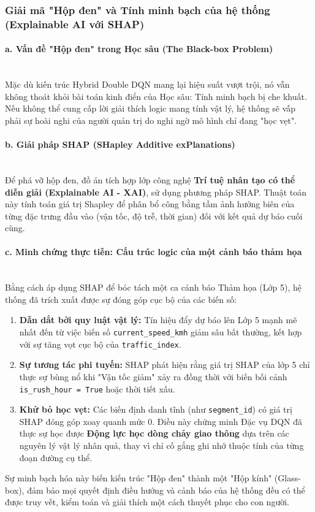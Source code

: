 \subsubsection{Giải mã "Hộp đen" và Tính minh bạch của hệ thống (Explainable AI với SHAP)}

\paragraph{a. Vấn đề "Hộp đen" trong Học sâu (The Black-box Problem)} \mbox{} \\
Mặc dù kiến trúc Hybrid Double DQN mang lại hiệu suất vượt trội, nó vẫn không thoát khỏi bài toán kinh điển của Học sâu: Tính minh bạch bị che khuất. Nếu không thể cung cấp lời giải thích logic mang tính vật lý, hệ thống sẽ vấp phải sự hoài nghi của người quản trị do nghi ngờ mô hình chỉ đang "học vẹt".

\paragraph{b. Giải pháp SHAP (SHapley Additive exPlanations)} \mbox{} \\
Để phá vỡ hộp đen, đồ án tích hợp lớp công nghệ \textbf{Trí tuệ nhân tạo có thể diễn giải (Explainable AI - XAI)}, sử dụng phương pháp SHAP. Thuật toán này tính toán giá trị Shapley để phân bổ công bằng tầm ảnh hưởng biên của từng đặc trưng đầu vào (vận tốc, độ trễ, thời gian) đối với kết quả dự báo cuối cùng.

\paragraph{c. Minh chứng thực tiễn: Cấu trúc logic của một cảnh báo thảm họa} \mbox{} \\
Bằng cách áp dụng SHAP để bóc tách một ca cảnh báo Thảm họa (Lớp 5), hệ thống đã trích xuất được sự đóng góp cục bộ của các biến số:
\begin{enumerate}
    \item \textbf{Dẫn dắt bởi quy luật vật lý:} Tín hiệu đẩy dự báo lên Lớp 5 mạnh mẽ nhất đến từ việc biến số \texttt{current\_speed\_kmh} giảm sâu bất thường, kết hợp với sự tăng vọt cục bộ của \texttt{traffic\_index}.
    \item \textbf{Sự tương tác phi tuyến:} SHAP phát hiện rằng giá trị SHAP của lớp 5 chỉ thực sự bùng nổ khi "Vận tốc giảm" xảy ra đồng thời với biến bối cảnh \texttt{is\_rush\_hour = True} hoặc thời tiết xấu.
    \item \textbf{Khử bỏ học vẹt:} Các biến định danh tĩnh (như \texttt{segment\_id}) có giá trị SHAP đóng góp xoay quanh mức $0$. Điều này chứng minh Đặc vụ DQN đã thực sự học được \textbf{Động lực học dòng chảy giao thông} dựa trên các nguyên lý vật lý nhân quả, thay vì chỉ cố gắng ghi nhớ thuộc tính của từng đoạn đường cụ thể.
\end{enumerate}

Sự minh bạch hóa này biến kiến trúc "Hộp đen" thành một "Hộp kính" (Glass-box), đảm bảo mọi quyết định điều hướng và cảnh báo của hệ thống đều có thể được truy vết, kiểm toán và giải thích một cách thuyết phục cho con người.
